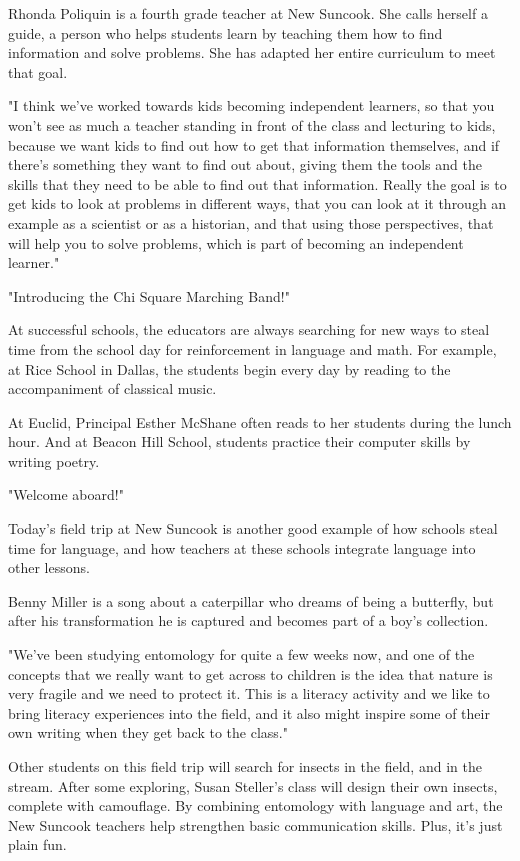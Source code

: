 Rhonda Poliquin is a fourth grade teacher at New Suncook. She calls herself a guide, a person who helps students learn by teaching them how to find information and solve problems. She has adapted her entire curriculum to meet that goal.

"I think we've worked towards kids becoming independent learners, so that you won't see as much a teacher standing in front of the class and lecturing to kids, because we want kids to find out how to get that information themselves, and if there's something they want to find out about, giving them the tools and the skills that they need to be able to find out that information. Really the goal is to get kids to look at problems in different ways, that you can look at it through an example as a scientist or as a historian, and that using those perspectives, that will help you to solve problems, which is part of becoming an independent learner."

"Introducing the Chi Square Marching Band!"

At successful schools, the educators are always searching for new ways to steal time from the school day for reinforcement in language and math. For example, at Rice School in Dallas, the students begin every day by reading to the accompaniment of classical music.

At Euclid, Principal Esther McShane often reads to her students during the lunch hour. And at Beacon Hill School, students practice their computer skills by writing poetry.

"Welcome aboard!"

Today's field trip at New Suncook is another good example of how schools steal time for language, and how teachers at these schools integrate language into other lessons.

Benny Miller is a song about a caterpillar who dreams of being a butterfly, but after his transformation he is captured and becomes part of a boy's collection.

"We've been studying entomology for quite a few weeks now, and one of the concepts that we really want to get across to children is the idea that nature is very fragile and we need to protect it. This is a literacy activity and we like to bring literacy experiences into the field, and it also might inspire some of their own writing when they get back to the class."

Other students on this field trip will search for insects in the field, and in the stream. After some exploring, Susan Steller's class will design their own insects, complete with camouflage. By combining entomology with language and art, the New Suncook teachers help strengthen basic communication skills. Plus, it's just plain fun.

